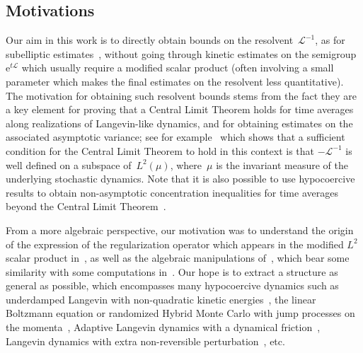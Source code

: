 \documentclass[10pt]{amsart}
\theoremstyle{definition}\newtheorem{defi}[theo]{Definition}\newtheorem{rema}[theo]{Remark}\newtheorem{exam}[theo]{Example}\newtheorem{exem}[theo]{Example}\newtheorem{nota}[theo]{Notation}
\newcommand{\rme}{\mathrm{e}}
\newcommand{\cL}{\mathcal{L}}
\begin{document}
\subsection*{Motivations}
Our aim in this work is to directly obtain bounds on the resolvent~$\cL^{-1}$, as for subelliptic estimates~\cite{EH03,HN04,HN05}, without going through kinetic estimates on the semigroup $\rme^{t \cL}$ which usually require a modified scalar product (often involving a small parameter which makes the final estimates on the resolvent less quantitative). The motivation for obtaining such resolvent bounds stems from the fact they are a key element for proving that a Central Limit Theorem holds for time averages along realizations of Langevin-like dynamics, and for obtaining estimates on the associated asymptotic variance; see for example~\cite{Bhattacharya} which shows that a sufficient condition for the Central Limit Theorem to hold in this context is that $-\cL^{-1}$ is well defined on a subspace of~$L^2(\mu)$, where~$\mu$ is the invariant measure of the underlying stochastic dynamics. Note that it is also possible to use hypocoercive results to obtain non-asymptotic concentration inequalities for time averages beyond the Central Limit Theorem~\cite{BRB19,Mon19b}.

From a more algebraic perspective, our motivation was to understand the origin of the expression of the regularization operator which appears in the modified $L^2$ scalar product in~\cite{Herau06,DMS09,DMS15}, as well as the algebraic manipulations of~\cite{AM19,CLW19}, which bear some similarity with some computations in~\cite{Herau06,DMS09,DMS15}. Our hope is to extract a structure as general as possible, which encompasses many hypocoercive dynamics such as underdamped Langevin with non-quadratic kinetic energies~\cite{ST18}, the linear Boltzmann equation or randomized Hybrid Monte Carlo with jump processes on the momenta~\cite{BRSS17}, Adaptive Langevin dynamics with a dynamical friction~\cite{Herzog18,LSS19}, Langevin dynamics with extra non-reversible perturbation~\cite{DNS17}, etc.
\end{document}
